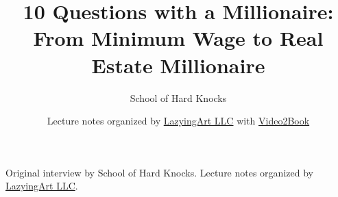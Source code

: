 \documentclass[11pt,oneside]{book}
\begin{document}
\frontmatter
\title{10 Questions with a Millionaire: From Minimum Wage to Real Estate Millionaire}
\author{School of Hard Knocks}
\date{Lecture notes organized by \href{https://lazying.art}{LazyingArt LLC} with \href{https://github.com/lachlanchen/Video2Book}{Video2Book}}
\maketitle
\begin{center}
\small Original interview by School of Hard Knocks. Lecture notes organized by \href{https://lazying.art}{LazyingArt LLC}.
\end{center}
\clearpage
\mainmatter

\end{document}
